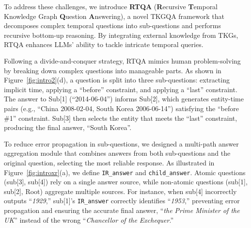 \documentclass[11pt]{article}
\begin{document}
To address these challenges, we introduce \textbf{RTQA} (\textbf{R}ecursive \textbf{T}emporal Knowledge Graph \textbf{Q}uestion \textbf{A}nswering), a novel TKGQA framework that decomposes complex temporal questions into sub-questions and performs recursive bottom-up reasoning. By integrating external knowledge from TKGs, RTQA enhances LLMs' ability to tackle intricate temporal queries.

Following a divide-and-conquer strategy, RTQA mimics human problem-solving by breaking down complex questions into manageable parts. As shown in Figure~\ref{fig:intro2}(d), a question is split into three sub-questions: extracting implicit time, applying a ``before'' constraint, and applying a ``last'' constraint. The answer to Sub[1] (``2014-06-04'') informs Sub[2], which generates entity-time pairs (e.g., ``China 2008-02-04, South Korea 2006-06-14'') satisfying the ``before \#1'' constraint. Sub[3] then selects the entity that meets the ``last'' constraint, producing the final answer, ``South Korea''.


To reduce error propagation in sub-questions, we designed a multi-path answer aggregation module that combines answers from both sub-questions and the original question, selecting the most reliable response. As illustrated in Figure~\ref{fig:introxr}(a), we define \texttt{IR\_answer} and \texttt{child\_answer}. Atomic questions (sub[3], sub[4]) rely on a single answer source, while non-atomic questions (sub[1], sub[2], Root) aggregate multiple sources. For instance, when sub[4] incorrectly outputs “\textit{1929},” sub[1]’s \texttt{IR\_answer} correctly identifies “\textit{1953},” preventing error propagation and ensuring the accurate final answer, “\textit{the Prime Minister of the UK}” instead of the wrong “\textit{Chancellor of the Exchequer}.”
\end{document}
